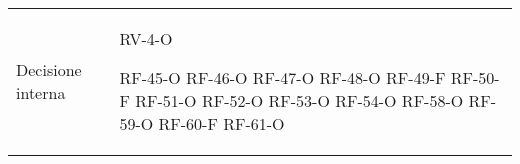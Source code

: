 \begin{longtable}{ 
		>{}p{} 
		>{}p{} }
Decisione interna &
	RV-4-O	\newline
	
	RF-45-O \newline
	RF-46-O \newline
	RF-47-O \newline
	RF-48-O \newline
	RF-49-F \newline
	RF-50-F \newline
	RF-51-O \newline
	RF-52-O \newline
	RF-53-O \newline
	RF-54-O \newline
	RF-58-O \newline
	RF-59-O \newline
	RF-60-F \newline
	RF-61-O \tabularnewline
	

\end{longtable}
